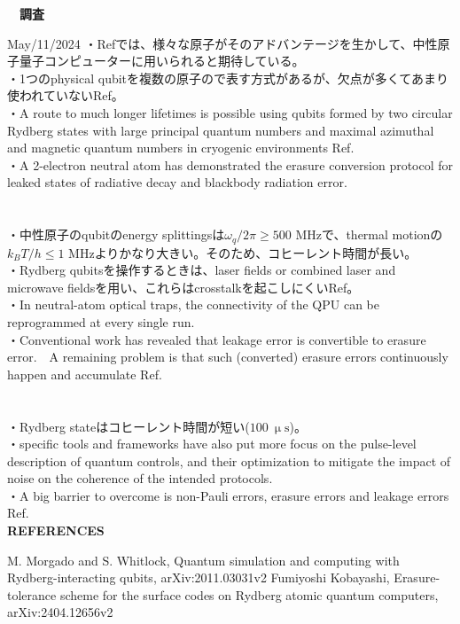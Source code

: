 \documentclass[a4paper,10.5pt]{ltjsarticle}
\begin{document}
\centerline
{\huge \bfseries　調査}
\rightline
{May/11/2024}
\leftline
{}
・Ref\cite{1}では、様々な原子がそのアドバンテージを生かして、中性原子量子コンピューターに用いられると期待している。\\
・1つのphysical qubitを複数の原子ので表す方式があるが、欠点が多くてあまり使われていないRef\cite{1}。\\
・A route to much longer lifetimes is possible using qubits formed by two circular Rydberg states with large principal quantum numbers and maximal azimuthal and magnetic quantum numbers in cryogenic environments Ref\cite{1}.\\
・A 2-electron neutral atom has demonstrated the erasure conversion protocol for leaked states of radiative decay and blackbody radiation error.\\
\\
\\
・中性原子のqubitのenergy splittingsは$\omega_q/2\pi\geq500$ MHzで、thermal motionの$k_BT/h\leq 1$ MHzよりかなり大きい。そのため、コヒーレント時間が長い。\\
・Rydberg qubitsを操作するときは、laser fields or combined laser and microwave fieldsを用い、これらはcrosstalkを起こしにくいRef\cite{1}。\\
・In neutral-atom optical traps, the connectivity of the QPU can be reprogrammed at every single run.\\
・Conventional work has revealed that leakage error is convertible to erasure error.　A remaining problem is that such (converted) erasure errors continuously happen and accumulate Ref\cite{2}.\\
\\
\\
・Rydberg stateはコヒーレント時間が短い($100\ \upmu\mathrm{s}$)。\\
・specific tools and frameworks have also put more focus on the pulse-level
description of quantum controls, and their optimization to mitigate the impact of noise on the coherence of the intended protocols.\\
・A big barrier to overcome is non-Pauli errors, erasure errors and
leakage errors Ref\cite{2}.\\
\clearpage
{\Large \bfseries REFERENCES}
\begin{thebibliography}{1}
\vspace{-1.5cm}
   M. Morgado and S. Whitlock, Quantum simulation and computing with Rydberg-interacting qubits, arXiv:2011.03031v2
   Fumiyoshi Kobayashi, Erasure-tolerance scheme for the surface codes on Rydberg atomic quantum
computers, arXiv:2404.12656v2
\end{thebibliography}
\end{document}
